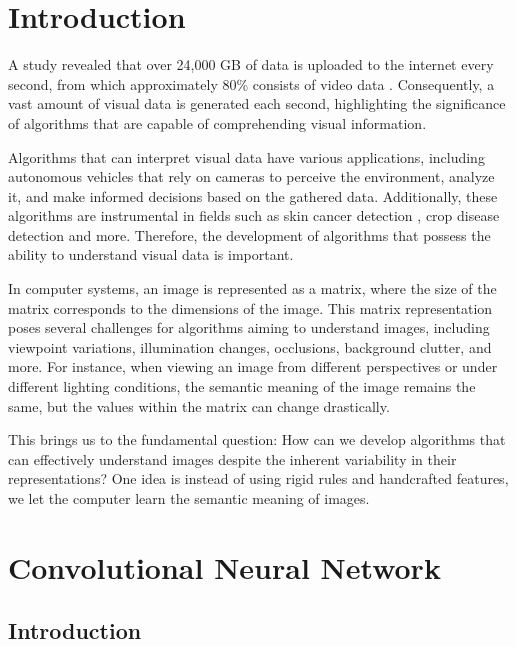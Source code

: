 \section{Introduction} \label{Introduction}

A study revealed that over 24,000 GB of data is uploaded to the internet every second, from which approximately 80\% consists of video data \citep{CiscoInternetStudy}.
Consequently, a vast amount of visual data is generated each second, highlighting the significance of algorithms that are capable of comprehending visual information.

Algorithms that can interpret visual data have various applications, including autonomous vehicles \citep{selfdrivingcars_cnn} that rely on cameras to perceive the environment, analyze it, and make informed decisions based on the gathered data. Additionally, these algorithms are instrumental in fields such as skin cancer detection \citep{skin_cancer_detection_cnn}, crop disease detection \citep{crop_disease_detection} and more. Therefore, the development of algorithms that possess the ability to understand visual data is important.

In computer systems, an image is represented as a matrix, where the size of the matrix corresponds to the dimensions of the image.
This matrix representation poses several challenges for algorithms aiming to understand images, including viewpoint variations, illumination changes, occlusions, background clutter, and more.
For instance, when viewing an image from different perspectives or under different lighting conditions, the semantic meaning of the image remains the same, but the values within the matrix can change drastically.

This brings us to the fundamental question: How can we develop algorithms that can effectively understand images despite the inherent variability in their representations?
One idea is instead of using rigid rules and handcrafted features, we let the computer learn the semantic meaning of images.

\section{Convolutional Neural Network} \label{CNN}

\subsection{Introduction}

